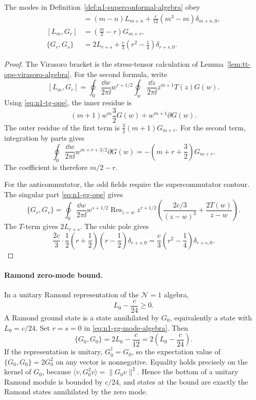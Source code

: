 \begin{lemma}[Mode algebra from the \(\mathcal N=1\) OPEs]
\label{lem:n1-mode-algebra}
The modes in Definition~\ref{def:n1-superconformal-algebra} obey
\begin{align}
  [L_m,L_n]
  &=
  (m-n)L_{m+n}
  +\frac{c}{12}(m^3-m)\delta_{m+n,0},
  \label{eq:n1-virasoro-mode-algebra}\\
  [L_m,G_r]
  &=
  \left(\frac m2-r\right)G_{m+r},
  \label{eq:n1-lg-mode-algebra}\\
  \{G_r,G_s\}
  &=
  2L_{r+s}
  +\frac c3\left(r^2-\frac14\right)\delta_{r+s,0}.
  \label{eq:n1-gg-mode-algebra}
\end{align}
\end{lemma}

\begin{proof}
The Virasoro bracket is the stress-tensor calculation of
Lemma~\ref{lem:tt-ope-virasoro-algebra}.  For the second formula,
write
\[
  [L_m,G_r]
  =
  \oint_0\frac{\dd w}{2\pi\ii}w^{r+1/2}
  \oint_w\frac{\dd z}{2\pi\ii}z^{m+1}T(z)G(w).
\]
Using \eqref{eq:n1-tg-ope}, the inner residue is
\[
  (m+1)w^m\frac32G(w)+w^{m+1}\partial G(w).
\]
The outer residue of the first term is
\(\frac32(m+1)G_{m+r}\).  For the second term, integration by parts gives
\[
  \oint_0\frac{\dd w}{2\pi\ii}w^{m+r+3/2}\partial G(w)
  =
  -\left(m+r+\frac32\right)G_{m+r}.
\]
The coefficient is therefore \(m/2-r\).

For the anticommutator, the odd fields require the supercommutator contour.
The singular part \eqref{eq:n1-gg-ope} gives
\[
  \{G_r,G_s\}
  =
  \oint_0\frac{\dd w}{2\pi\ii}w^{s+1/2}
  \operatorname{Res}_{z=w}
  z^{r+1/2}
  \left(
    \frac{2c/3}{(z-w)^3}+\frac{2T(w)}{z-w}
  \right).
\]
The \(T\)-term gives \(2L_{r+s}\).  The cubic pole gives
\[
  \frac{2c}{3}\cdot
  \frac12
  \left(r+\frac12\right)\left(r-\frac12\right)
  \delta_{r+s,0}
  =
  \frac c3\left(r^2-\frac14\right)\delta_{r+s,0}.
\]
\end{proof}

\paragraph{Ramond zero-mode bound.}
In a unitary Ramond representation of the \(\mathcal N=1\) algebra,
\begin{equation}
  L_0-\frac{c}{24}\ge0.
  \label{eq:n1-ramond-bound}
\end{equation}
A Ramond ground state is a state annihilated by \(G_0\), equivalently a state
with \(L_0=c/24\).
Set \(r=s=0\) in \eqref{eq:n1-gg-mode-algebra}.  Then
\[
  \{G_0,G_0\}=2L_0-\frac c{12}
  =
  2\left(L_0-\frac c{24}\right).
\]
If the representation is unitary, \(G_0^\dagger=G_0\), so the expectation
value of \(\{G_0,G_0\}=2G_0^2\) on any vector is nonnegative.  Equality
holds precisely on the kernel of \(G_0\), because
\(\langle v,G_0^2v\rangle=\|G_0v\|^2\).  Hence the bottom of a unitary Ramond
module is bounded by \(c/24\), and states at the bound are exactly the
Ramond states annihilated by the zero mode.

